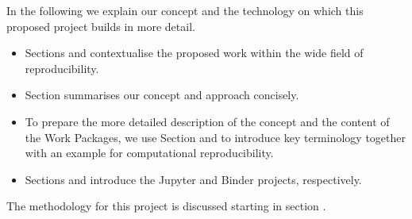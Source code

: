 In the following we explain our concept and the technology on which this
proposed project builds in more detail.
\begin{itemize}
\item Sections  and
   contextualise the proposed work
  within the wide field of reproducibility.
\item Section  summarises our concept and
  approach concisely.

\item To prepare the more detailed description of the concept and the content of
  the Work Packages, we use Section  and
   to introduce key terminology together with an
  example for computational reproducibility.

\item Sections  and 
  introduce the Jupyter and Binder projects, respectively.

\end{itemize}
  
\noindent The methodology for this project is discussed starting in section
.




%
%
%
%
%
%
%
%


